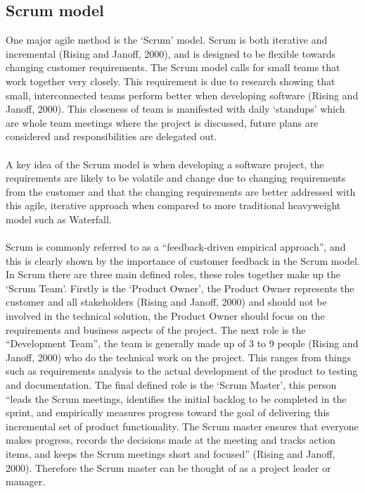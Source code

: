 \documentclass{CRPITStyle}
\begin{document}
		\subsection{Scrum model}
		One major agile method is the `Scrum' model. Scrum is both iterative and incremental (Rising and Janoff, 2000), and is designed to be flexible towards changing
		customer requirements. The Scrum model calls for small teams that work together very closely. This requirement is due to research showing that small, interconnected teams perform better when developing software (Rising and Janoff, 2000). This closeness of team is manifested with daily `standups' which are whole team
		meetings where the project is discussed, future plans are considered and responsibilities are delegated out.\\
		~\\
		A key idea of the Scrum model is when developing a software project, the requirements are likely to be volatile and change due to changing requirements from
		the customer and that the changing requirements are better addressed with this agile, iterative approach when compared to more traditional heavyweight model such as Waterfall.\\
		~\\
		Scrum is commonly referred to as a ``feedback-driven empirical approach'', and this is clearly shown by the importance of customer feedback in the Scrum model. 
		In Scrum there are three main defined roles, these roles together make up the `Scrum Team'. Firstly is the `Product Owner', the Product Owner represents the
		customer and all stakeholders (Rising and Janoff, 2000) and should not be involved in the technical solution, the Product Owner should focus on the requirements
		and business aspects of the project. The next role is the ``Development Team'', the team is generally made up of 3 to 9 people (Rising and Janoff, 2000) who do
		the technical work on the project. This ranges from things such as requirements analysis to the actual development of the product to testing and documentation.
		The final defined role is the `Scrum Master', this person ``leads the Scrum meetings, identifies the initial backlog to be completed in the sprint, and empirically measures progress toward the goal of delivering this incremental set of product functionality.  The Scrum master ensures that everyone makes progress, records the decisions made at the meeting and tracks action items, and keeps the Scrum meetings short and focused'' (Rising and Janoff, 2000). Therefore the Scrum master can be thought of as a project leader or manager.\\
		~\\
\end{document}
